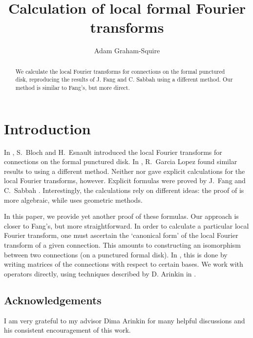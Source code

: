 \documentclass[11pt]{amsart}
\theoremstyle{plain}
\theoremstyle{definition}
\theoremstyle{remark}
\begin{document}
\normalsize

\title{Calculation of local formal Fourier transforms}
\author{Adam Graham-Squire}
\date{}





 \begin{abstract} We calculate the local Fourier transforms for connections on the formal punctured disk, reproducing the results of J. Fang \cite{fang} and C. Sabbah \cite{sabbah} using a different method. Our method is similar to Fang's, but more direct.
 \end{abstract}

\maketitle

\section{Introduction}\label{intro}

In \cite{bloch}, S.~Bloch and H.~Esnault introduced the local Fourier transforms for connections on the formal punctured disk. In \cite{garcialopez}, R.~Garcia Lopez found similar results to \cite{bloch} using a different method.  Neither \cite{bloch} nor \cite{garcialopez} gave explicit calculations for the local Fourier transforms, however.
Explicit formulas were proved by J.~Fang \cite{fang} and C.~Sabbah \cite{sabbah}. Interestingly, the calculations rely
on different ideas: the proof of \cite{fang} is more algebraic, while \cite{sabbah} uses geometric methods.

In this paper, we provide yet another proof of these formulas. Our approach is closer to Fang's, but more straightforward. In order to
calculate a particular local Fourier transform, one must ascertain the `canonical form' of the local Fourier transform of a given connection.
This amounts to constructing an isomorphism between two connections (on a punctured formal disk). In \cite{fang}, this is done
by writing matrices of the connections with respect to certain bases. We work with operators directly, using techniques
described by D. Arinkin in \cite[Section 7]{dima}.

\subsection*{Acknowledgements}\label{subsec ack} I am very grateful to my advisor Dima Arinkin for many helpful discussions and his consistent encouragement of this work.
\end{document}
